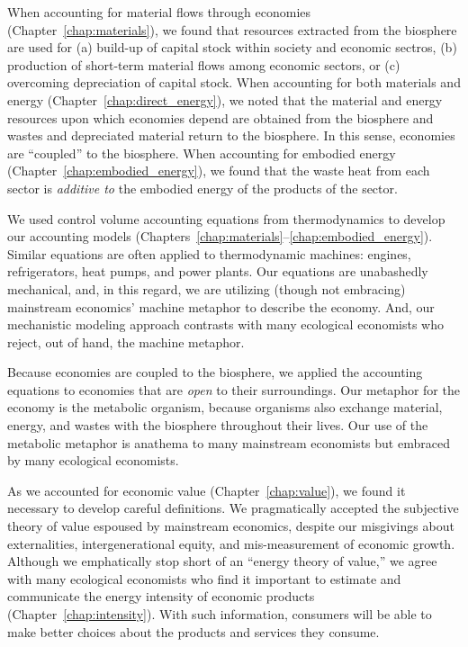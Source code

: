 When accounting for material flows through economies (Chapter~\ref{chap:materials}),
we found that resources extracted from the biosphere are used for 
(a) build-up of capital stock within society and economic sectros, 
(b) production of short-term material flows among economic sectors, or
(c) overcoming depreciation of capital stock.
When accounting for both materials and energy (Chapter~\ref{chap:direct_energy}),
we noted that the material and energy resources upon which economies depend
are obtained from the biosphere and wastes and depreciated
material return to the biosphere.
In this sense, economies are ``coupled'' to the biosphere.
When accounting for embodied energy (Chapter~\ref{chap:embodied_energy}),
we found that the waste heat from each sector 
is \emph{additive to} the embodied energy of the products of the sector.

We used control volume accounting equations 
from thermodynamics to develop our accounting models 
(Chapters~\ref{chap:materials}--\ref{chap:embodied_energy}).
Similar equations are often applied to thermodynamic machines:
engines, refrigerators, heat pumps, and power plants.
Our equations are unabashedly mechanical, 
and, in this regard, we are utilizing (though not embracing) 
mainstream economics' machine metaphor to describe the economy.
And, our mechanistic modeling approach contrasts 
with many ecological economists
who reject, out of hand, the machine metaphor.

Because economies are coupled to the biosphere,
we applied the accounting equations 
to economies that are \emph{open} to their surroundings. 
Our metaphor for the economy is the metabolic organism, 
because organisms also exchange material, energy, and wastes with the biosphere
throughout their lives.
Our use of the metabolic metaphor is anathema to many 
mainstream economists but embraced by many ecological economists.

As we accounted for economic value 
(Chapter~\ref{chap:value}),
we found it necessary to develop careful definitions.
We pragmatically accepted the subjective theory of value espoused 
by mainstream economics, despite our misgivings 
about externalities, intergenerational equity, 
and mis-measurement of economic growth.
Although we emphatically stop short of an ``energy theory of value,'' %
we agree with many ecological economists
who find it important to estimate and communicate 
the energy intensity of economic products (Chapter~\ref{chap:intensity}).
With such information, consumers will be able to make
better choices about the products and services they consume.

